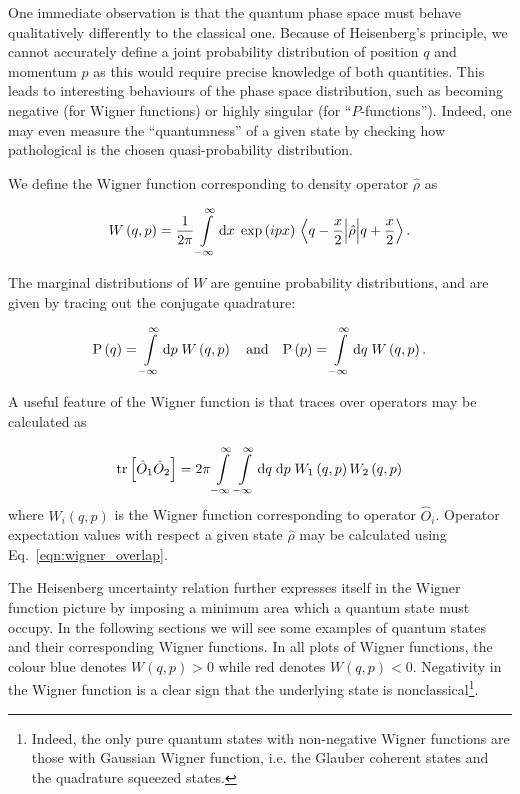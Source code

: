 One immediate observation is that the quantum phase space must behave qualitatively differently to the classical one. Because of Heisenberg's principle, we cannot accurately define a joint probability distribution of position $q$ and momentum $p$ as this would require precise knowledge of both quantities. This leads to interesting behaviours of the phase space distribution, such as becoming negative (for Wigner functions) or highly singular (for ``$P$-functions''). Indeed, one may even measure the ``quantumness'' of a given state by checking how pathological is the chosen quasi-probability distribution.

We define the Wigner function corresponding to density operator $\hat{\rho}$ as \cite{Leonhardt2010}

\begin{equation}\label{eqn:intro_wigners_formula}
W\left(q, p\right) = \frac{1}{2 \pi} \int\limits_{-\infty}^{\infty} \mathrm{d}x \; \exp\left(i p x\right) \mel{q - \frac{x}{2}}{\hat{\rho}}{q + \frac{x}{2}}.
\end{equation}

\noindent The marginal distributions of $W$ are genuine probability distributions, and are given by tracing out the conjugate quadrature:

\begin{equation}
\text{P}\left(q\right) = \int\limits_{-\infty}^\infty \mathrm{d}p \; W\left(q, p\right) \qq{and} \text{P}\left(p\right) = \int\limits_{-\infty}^\infty \mathrm{d}q \; W\left(q, p\right).
\end{equation}

\noindent A useful feature of the Wigner function is that traces over operators may be calculated as

\begin{equation}\label{eqn:wigner_overlap}
\tr\left[\hat{O}_1 \hat{O}_2\right] = 2\pi \int\limits_{-\infty}^\infty \int\limits_{-\infty}^{\infty} \mathrm{d}q \; \mathrm{d}p \; W_1\left(q, p\right) W_2\left(q, p\right)
\end{equation}
where $W_i\left(q, p\right)$ is the Wigner function corresponding to operator $\hat{O}_i$. Operator expectation values with respect a given state $\hat{\rho}$ may be calculated using Eq.~\ref{eqn:wigner_overlap}. 

The Heisenberg uncertainty relation further expresses itself in the Wigner function picture by imposing a minimum area which a quantum state must occupy. In the following sections we will see some examples of quantum states and their corresponding Wigner functions. In all plots of Wigner functions, the colour blue denotes $W\left(q, p\right) >0$ while red denotes $W \left(q, p\right) <0$. Negativity in the Wigner function is a clear sign that the underlying state is nonclassical\footnote{Indeed, the only pure quantum states with non-negative Wigner functions are those with Gaussian Wigner function, i.e. the Glauber coherent states and the quadrature squeezed states.}.



